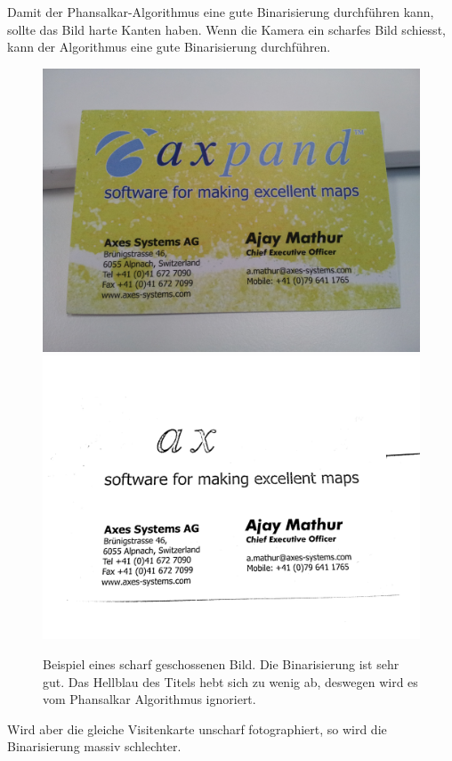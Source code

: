 \documentclass[10pt]{article}
\begin{document}
Damit der Phansalkar-Algorithmus eine gute Binarisierung durchführen kann, sollte das Bild harte Kanten haben. Wenn die Kamera ein scharfes Bild schiesst, kann der Algorithmus eine gute Binarisierung durchführen.
\begin{figure}[h!]
	\centering
	\includegraphics[scale= 0.06]{AMathur.jpg}
	\includegraphics[scale= 0.06]{AMathurPhansalkar.png}
\caption{Beispiel eines scharf geschossenen Bild. Die Binarisierung ist sehr gut. Das Hellblau des Titels hebt sich zu wenig ab, deswegen wird es vom Phansalkar Algorithmus ignoriert.}
\end{figure}

Wird aber die gleiche Visitenkarte unscharf fotographiert, so wird die Binarisierung massiv schlechter.
\end{document}
